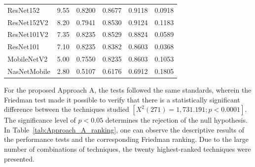 \documentclass[final,5p,times,twocolumn]{elsarticle}
\begin{document}
\begin{table}[h!]
{\begin{tabular}{|l|c|c|c|c|c|}
			ResNet152 & 9.55 & 0.8200 & 0.8677 & 0.9118 & 0.0918 \\
			ResNet152V2 & 8.20 & 0.7941 & 0.8530 & 0.9124 & 0.1183 \\
			ResNet101V2 & 7.35 & 0.8235 & 0.8529 & 0.8824 & 0.0589 \\
			ResNet101 & 7.10 & 0.8235 & 0.8382 & 0.8603 & 0.0368 \\
			MobileNetV2 & 5.00 & 0.7550 & 0.8235 & 0.8603 & 0.1053 \\
			NasNetMobile & 2.80 & 0.5107 & 0.6176 & 0.6912 & 0.1805 \\
			\hline
		\end{tabular}
	}
\end{table}

For the proposed Approach A, the tests followed the same standards, wherein the Friedman test made it possible to verify that there is a statistically significant difference between the techniques studied $[X^2(271)=1,731.191; p<0.0001]$. The significance level of $p<0.05$ determines the rejection of the null hypothesis. In Table~\ref{tab:Approach_A_ranking}, one can observe the descriptive results of the performance tests and the corresponding Friedman ranking. Due to the large number of combinations of techniques, the twenty highest-ranked techniques were presented.
\end{document}
